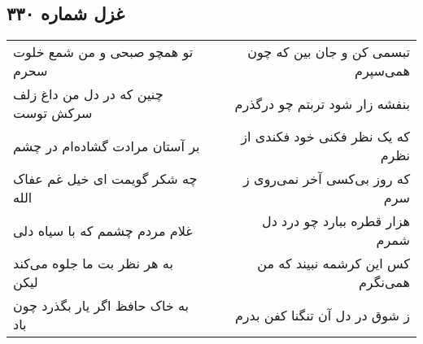 \begin{center}
\section*{غزل شماره ۳۳۰}
\label{sec:sh330}
\begin{longtable}{l p{0.5cm} r}
تو همچو صبحی و من شمع خلوت سحرم
&&
تبسمی کن و جان بین که چون همی‌سپرم
\\
چنین که در دل من داغ زلف سرکش توست
&&
بنفشه زار شود تربتم چو درگذرم
\\
بر آستان مرادت گشاده‌ام در چشم
&&
که یک نظر فکنی خود فکندی از نظرم
\\
چه شکر گویمت ای خیل غم عفاک الله
&&
که روز بی‌کسی آخر نمی‌روی ز سرم
\\
غلام مردم چشمم که با سیاه دلی
&&
هزار قطره ببارد چو درد دل شمرم
\\
به هر نظر بت ما جلوه می‌کند لیکن
&&
کس این کرشمه نبیند که من همی‌نگرم
\\
به خاک حافظ اگر یار بگذرد چون باد
&&
ز شوق در دل آن تنگنا کفن بدرم
\\
\end{longtable}
\end{center}
